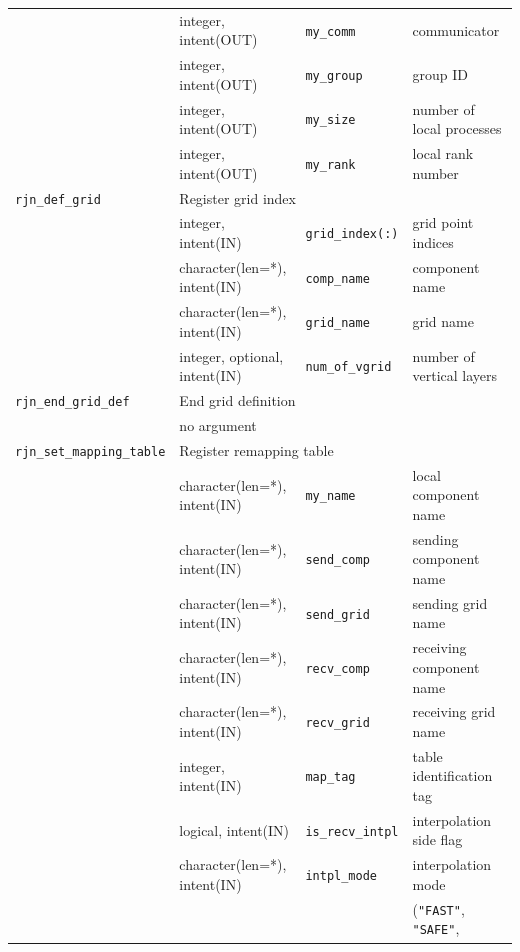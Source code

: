 \documentclass[11pt,a4paper]{report}
\begin{document}
\begin{table}[H]
\begin{center}
{\begin{tabular}{llll}
                & integer, intent(OUT) & \texttt{my\_comm} & communicator\\
                & integer, intent(OUT) & \texttt{my\_group} & group ID\\
                & integer, intent(OUT) & \texttt{my\_size} & number of local processes\\
                & integer, intent(OUT) & \texttt{my\_rank} & local rank number\\
\hline
 \texttt{rjn\_def\_grid} & \multicolumn{3}{l}{Register grid index} \\
                & integer, intent(IN) & \texttt{grid\_index(:)} & grid point indices\\
                & character(len=*), intent(IN) & \texttt{comp\_name} & component name\\
                & character(len=*), intent(IN) & \texttt{grid\_name} & grid name\\
                & integer, optional, intent(IN) & \texttt{num\_of\_vgrid} & number of vertical layers\\
\hline
 \texttt{rjn\_end\_grid\_def} &  \multicolumn{3}{l}{End grid definition}\\
                & \multicolumn{3}{l}{no argument} \\
\hline
 \texttt{rjn\_set\_mapping\_table} & \multicolumn{3}{l}{Register remapping table} \\
                & character(len=*), intent(IN) & \texttt{my\_name} & local component name\\
                & character(len=*), intent(IN) & \texttt{send\_comp} & sending component name\\
                & character(len=*), intent(IN) & \texttt{send\_grid} & sending grid name\\
                & character(len=*), intent(IN) & \texttt{recv\_comp} & receiving component name\\
                & character(len=*), intent(IN) & \texttt{recv\_grid} & receiving grid name\\
                & integer, intent(IN) & \texttt{map\_tag} & table identification tag\\
                & logical, intent(IN) & \texttt{is\_recv\_intpl} & interpolation side flag\\
                & character(len=*), intent(IN) & \texttt{intpl\_mode} & interpolation mode\\
                &  &  & (\texttt{"FAST"}, \texttt{"SAFE"},\\

\end{tabular}}
\end{center}
\end{table}
\end{document}
